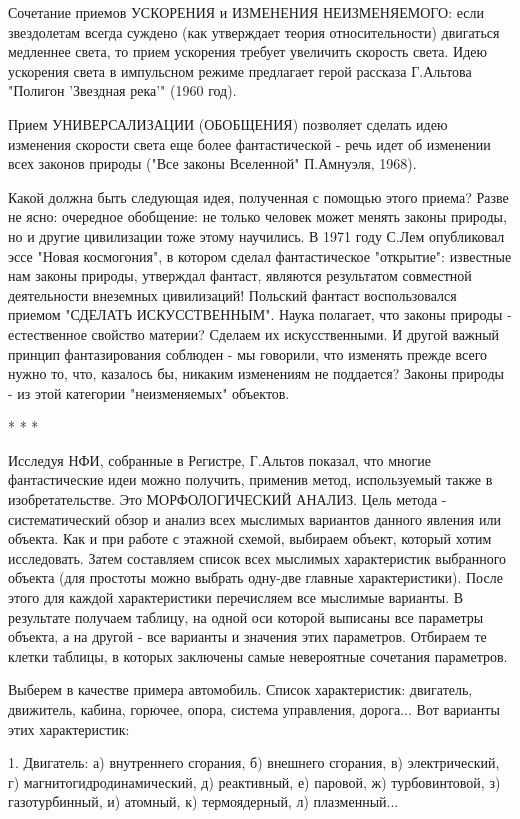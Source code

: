 \documentclass[11pt,a4paper]{article}
\begin{document}
Сочетание приемов УСКОРЕНИЯ и ИЗМЕНЕНИЯ НЕИЗМЕНЯЕМОГО: если звездолетам всегда суждено (как утверждает теория относительности) двигаться медленнее света, то прием ускорения требует увеличить скорость света. Идею ускорения света в импульсном режиме предлагает герой рассказа Г.Альтова "Полигон ’Звездная река’" (1960 год).

Прием УНИВЕРСАЛИЗАЦИИ (ОБОБЩЕНИЯ) позволяет сделать идею изменения скорости света еще более фантастической - речь идет об изменении всех законов природы ("Все законы Вселенной" П.Амнуэля, 1968).

Какой должна быть следующая идея, полученная с помощью этого приема? Разве не ясно: очередное обобщение: не только человек может менять законы природы, но и другие цивилизации тоже этому научились. В 1971 году С.Лем опубликовал эссе "Новая космогония", в котором сделал фантастическое "открытие": известные нам законы природы, утверждал фантаст, являются результатом совместной деятельности внеземных цивилизаций! Польский фантаст воспользовался приемом "СДЕЛАТЬ ИСКУССТВЕННЫМ". Наука полагает, что законы природы - естественное свойство материи? Сделаем их искусственными. И другой важный принцип фантазирования соблюден - мы говорили, что изменять прежде всего нужно то, что, казалось бы, никаким изменениям не поддается? Законы природы - из этой категории "неизменяемых" объектов.

* * *

Исследуя НФИ, собранные в Регистре, Г.Альтов показал, что многие фантастические идеи можно получить, применив метод, используемый также в изобретательстве. Это МОРФОЛОГИЧЕСКИЙ АНАЛИЗ. Цель метода - систематический обзор и анализ всех мыслимых вариантов данного явления или объекта. Как и при работе с этажной схемой, выбираем объект, который хотим исследовать. Затем составляем список всех мыслимых характеристик выбранного объекта (для простоты можно выбрать одну-две главные характеристики). После этого для каждой характеристики перечисляем все мыслимые варианты. В результате получаем таблицу, на одной оси которой выписаны все параметры объекта, а на другой - все варианты и значения этих параметров. Отбираем те клетки таблицы, в которых заключены самые невероятные сочетания параметров.

Выберем в качестве примера автомобиль. Список характеристик: двигатель, движитель, кабина, горючее, опора, система управления, дорога... Вот варианты этих характеристик:

1. Двигатель: а) внутреннего сгорания, б) внешнего сгорания, в) электрический, г) магнитогидродинамический, д) реактивный, е) паровой, ж) турбовинтовой, з) газотурбинный, и) атомный, к) термоядерный, л) плазменный...
\end{document}

